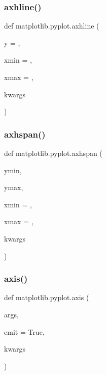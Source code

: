  \mbox{\label{namespacematplotlib_1_1pyplot_ae1c703faf09edbb310c1689ee4569c8c}} 
\subsubsection{\texorpdfstring{axhline()}{axhline()}}
{\footnotesize\ttfamily def matplotlib.\+pyplot.\+axhline (\begin{DoxyParamCaption}\item[{}]{y = {},  }\item[{}]{xmin = {},  }\item[{}]{xmax = {},  }\item[{}]{kwargs }\end{DoxyParamCaption})}

\mbox{\label{namespacematplotlib_1_1pyplot_af110601f76ada099dc4b0dfdb8312d81}} 
\subsubsection{\texorpdfstring{axhspan()}{axhspan()}}
{\footnotesize\ttfamily def matplotlib.\+pyplot.\+axhspan (\begin{DoxyParamCaption}\item[{}]{ymin,  }\item[{}]{ymax,  }\item[{}]{xmin = {},  }\item[{}]{xmax = {},  }\item[{}]{kwargs }\end{DoxyParamCaption})}

\mbox{\label{namespacematplotlib_1_1pyplot_a491a6aa585ceb1955264031156654647}} 
\subsubsection{\texorpdfstring{axis()}{axis()}}
{\footnotesize\ttfamily def matplotlib.\+pyplot.\+axis (\begin{DoxyParamCaption}\item[{}]{args,  }\item[{}]{emit = {\ttfamily True},  }\item[{}]{kwargs }\end{DoxyParamCaption})}

